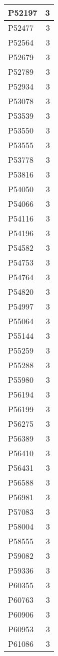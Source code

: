 \documentclass[
]{book}
\theoremstyle{definition}
\theoremstyle{definition}
\theoremstyle{definition}
\theoremstyle{definition}
\theoremstyle{remark}
\begin{document}
\begin{table}
\begin{tabular}{l|r}
\hline
P52197 & 3\\
\hline
P52477 & 3\\
\hline
P52564 & 3\\
\hline
P52679 & 3\\
\hline
P52789 & 3\\
\hline
P52934 & 3\\
\hline
P53078 & 3\\
\hline
P53539 & 3\\
\hline
P53550 & 3\\
\hline
P53555 & 3\\
\hline
P53778 & 3\\
\hline
P53816 & 3\\
\hline
P54050 & 3\\
\hline
P54066 & 3\\
\hline
P54116 & 3\\
\hline
P54196 & 3\\
\hline
P54582 & 3\\
\hline
P54753 & 3\\
\hline
P54764 & 3\\
\hline
P54820 & 3\\
\hline
P54997 & 3\\
\hline
P55064 & 3\\
\hline
P55144 & 3\\
\hline
P55259 & 3\\
\hline
P55288 & 3\\
\hline
P55980 & 3\\
\hline
P56194 & 3\\
\hline
P56199 & 3\\
\hline
P56275 & 3\\
\hline
P56389 & 3\\
\hline
P56410 & 3\\
\hline
P56431 & 3\\
\hline
P56588 & 3\\
\hline
P56981 & 3\\
\hline
P57083 & 3\\
\hline
P58004 & 3\\
\hline
P58555 & 3\\
\hline
P59082 & 3\\
\hline
P59336 & 3\\
\hline
P60355 & 3\\
\hline
P60763 & 3\\
\hline
P60906 & 3\\
\hline
P60953 & 3\\
\hline
P61086 & 3\\

\end{tabular}
\end{table}
\end{document}
